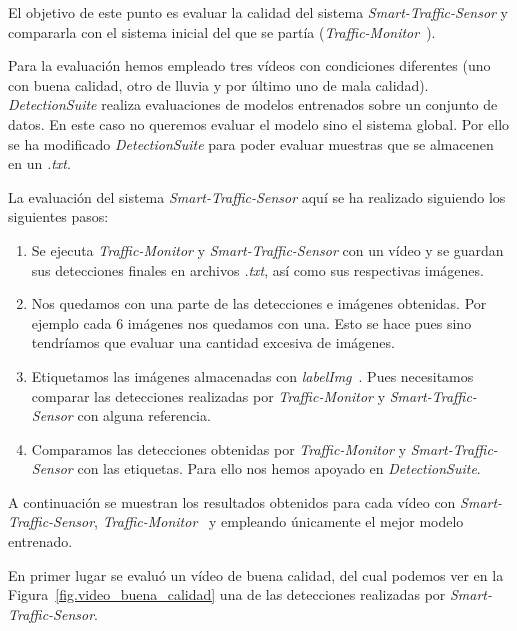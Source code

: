 El objetivo de este punto es evaluar la calidad del sistema \textit{Smart-Traffic-Sensor} y compararla con el sistema inicial del que se partía (\textit{Traffic-Monitor}~\cite{redo_tesis}). 

Para la evaluación hemos empleado tres vídeos con condiciones diferentes (uno con buena calidad, otro de lluvia y por último uno de mala calidad). \textit{DetectionSuite} realiza evaluaciones de modelos entrenados sobre un conjunto de datos. En este caso no queremos evaluar el modelo sino el sistema global. Por ello se ha modificado \textit{DetectionSuite} para poder evaluar muestras que se almacenen en un \textit{.txt}. 

La evaluación del sistema \textit{Smart-Traffic-Sensor} aquí se ha realizado siguiendo los siguientes pasos:

\begin{enumerate}
    \item Se ejecuta \textit{Traffic-Monitor} y \textit{Smart-Traffic-Sensor} con un vídeo y se guardan sus detecciones finales en archivos \textit{.txt}, así como sus respectivas imágenes.
    \item Nos quedamos con una parte de las detecciones e imágenes obtenidas. Por ejemplo cada 6 imágenes nos quedamos con una. Esto se hace pues sino tendríamos que evaluar una cantidad excesiva de imágenes.
    \item Etiquetamos las imágenes almacenadas con \textit{labelImg}~\cite{labelimg}. Pues necesitamos comparar las detecciones realizadas por \textit{Traffic-Monitor} y \textit{Smart-Traffic-Sensor} con alguna referencia.
    \item Comparamos las detecciones obtenidas por \textit{Traffic-Monitor} y \textit{Smart-Traffic-Sensor} con las etiquetas. Para ello nos hemos apoyado en \textit{DetectionSuite}.
\end{enumerate}


A continuación se muestran los resultados obtenidos para cada vídeo con \textit{Smart-Traffic-Sensor}, \textit{Traffic-Monitor}~\cite{redo_tesis} y empleando únicamente el mejor modelo entrenado.

En primer lugar se evaluó un vídeo de buena calidad, del cual podemos ver en la Figura~\ref{fig.video_buena_calidad} una de las detecciones realizadas por \textit{Smart-Traffic-Sensor}.

